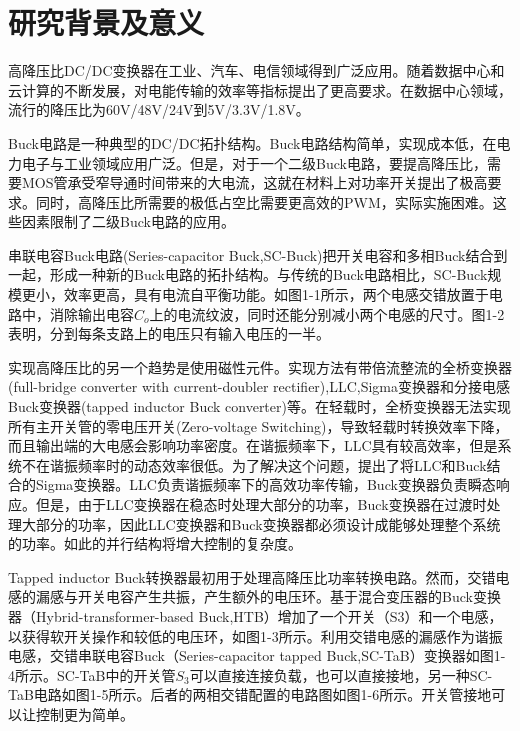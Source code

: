 \documentclass[12pt,a4paper]{report}
\begin{document}
\chapter{研究背景及意义}
高降压比DC/DC变换器在工业、汽车、电信领域得到广泛应用。随着数据中心和云计算的不断发展，对电能传输的效率等指标提出了更高要求。在数据中心领域，流行的降压比为60V/48V/24V到5V/3.3V/1.8V。


Buck电路是一种典型的DC/DC拓扑结构。Buck电路结构简单，实现成本低，在电力电子与工业领域应用广泛。但是，对于一个二级Buck电路，要提高降压比，需要MOS管承受窄导通时间带来的大电流，这就在材料上对功率开关提出了极高要求。同时，高降压比所需要的极低占空比需要更高效的PWM，实际实施困难。这些因素限制了二级Buck电路的应用。


串联电容Buck电路(Series-capacitor Buck,SC-Buck)把开关电容和多相Buck结合到一起，形成一种新的Buck电路的拓扑结构。与传统的Buck电路相比，SC-Buck规模更小，效率更高，具有电流自平衡功能。如图1-1所示，两个电感交错放置于电路中，消除输出电容$C_o$上的电流纹波，同时还能分别减小两个电感的尺寸。图1-2表明，分到每条支路上的电压只有输入电压的一半。


实现高降压比的另一个趋势是使用磁性元件。实现方法有带倍流整流的全桥变换器(full-bridge converter with current-doubler rectifier),LLC,Sigma变换器和分接电感Buck变换器(tapped inductor Buck converter)等。在轻载时，全桥变换器无法实现所有主开关管的零电压开关(Zero-voltage Switching)，导致轻载时转换效率下降，而且输出端的大电感会影响功率密度。在谐振频率下，LLC具有较高效率，但是系统不在谐振频率时的动态效率很低。为了解决这个问题，提出了将LLC和Buck结合的Sigma变换器。LLC负责谐振频率下的高效功率传输，Buck变换器负责瞬态响应。但是，由于LLC变换器在稳态时处理大部分的功率，Buck变换器在过渡时处理大部分的功率，因此LLC变换器和Buck变换器都必须设计成能够处理整个系统的功率。如此的并行结构将增大控制的复杂度。


Tapped inductor Buck转换器最初用于处理高降压比功率转换电路。然而，交错电感的漏感与开关电容产生共振，产生额外的电压环。基于混合变压器的Buck变换器（Hybrid-transformer-based Buck,HTB）增加了一个开关（S3）和一个电感，以获得软开关操作和较低的电压环，如图1-3所示。利用交错电感的漏感作为谐振电感，交错串联电容Buck（Series-capacitor tapped Buck,SC-TaB）变换器如图1-4所示。SC-TaB中的开关管$S_3$可以直接连接负载，也可以直接接地，另一种SC-TaB电路如图1-5所示。后者的两相交错配置的电路图如图1-6所示。开关管接地可以让控制更为简单。
\end{document}
